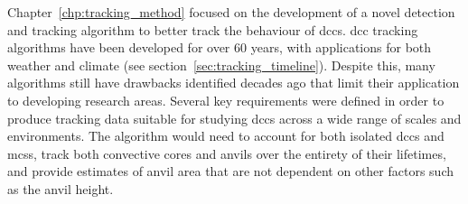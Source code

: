 

Chapter~\ref{chp:tracking_method} focused on the development of a novel detection and tracking algorithm to better track the behaviour of \acrshort{dcc}s.
\acrshort{dcc} tracking algorithms have been developed for over 60 years, with applications for both weather and climate (see section~\ref{sec:tracking_timeline}).
Despite this, many algorithms still have drawbacks identified decades ago \citep{augustine_mesoscale_1988} that limit their application to developing research areas.
Several key requirements were defined in order to produce tracking data suitable for studying \acrshort{dcc}s across a wide range of scales and environments.
The algorithm would need to account for both isolated \acrshort{dcc}s and \acrshort{mcs}s, track both convective cores and anvils over the entirety of their lifetimes, and provide estimates of anvil area that are not dependent on other factors such as the anvil height.

